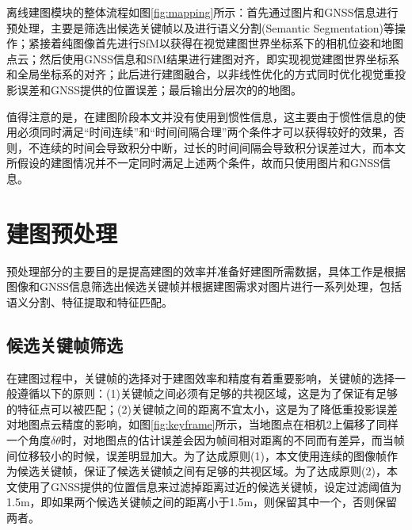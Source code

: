 离线建图模块的整体流程如图\ref{fig:mapping}所示：首先通过图片和GNSS信息进行预处理，主要是筛选出候选关键帧以及进行语义分割(Semantic Segmentation)等操作；紧接着纯图像首先进行SfM以获得在视觉建图世界坐标系下的相机位姿和地图点云；然后使用GNSS信息和SfM结果进行建图对齐，即实现视觉建图世界坐标系和全局坐标系的对齐；此后进行建图融合，以非线性优化的方式同时优化视觉重投影误差和GNSS提供的位置误差；最后输出分层次的的地图。

值得注意的是，在建图阶段本文并没有使用到惯性信息，这主要由于惯性信息的使用必须同时满足“时间连续”和“时间间隔合理”两个条件才可以获得较好的效果，否则，不连续的时间会导致积分中断，过长的时间间隔会导致积分误差过大，而本文所假设的建图情况并不一定同时满足上述两个条件，故而只使用图片和GNSS信息。

\section{建图预处理}
预处理部分的主要目的是提高建图的效率并准备好建图所需数据，具体工作是根据图像和GNSS信息筛选出候选关键帧并根据建图需求对图片进行一系列处理，包括语义分割、特征提取和特征匹配。

\subsection{候选关键帧筛选}
在建图过程中，关键帧的选择对于建图效率和精度有着重要影响，关键帧的选择一般遵循以下的原则：(1)关键帧之间必须有足够的共视区域，这是为了保证有足够的特征点可以被匹配；(2)关键帧之间的距离不宜太小，这是为了降低重投影误差对地图点云精度的影响，如图\ref{fig:keyframe}所示，当地图点在相机2上偏移了同样一个角度$\delta \theta$时，对地图点的估计误差会因为帧间相对距离的不同而有差异，而当帧间位移较小的时候，误差明显加大。为了达成原则(1)，本文使用连续的图像帧作为候选关键帧，保证了候选关键帧之间有足够的共视区域。为了达成原则(2)，本文使用了GNSS提供的位置信息来过滤掉距离过近的候选关键帧，设定过滤阈值为1.5m，即如果两个候选关键帧之间的距离小于1.5m，则保留其中一个，否则保留两者。

